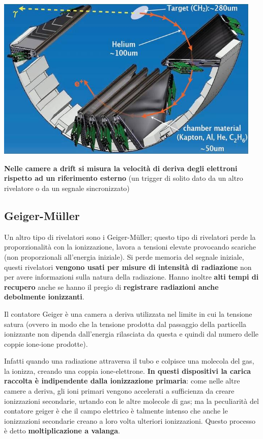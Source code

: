 \documentclass[a4paper,11pt,twoside,openany]{book}
\theoremstyle{definition}
\theoremstyle{plain}
\theoremstyle{plain}
\theoremstyle{definition}
\begin{document}
\begin{center}
\includegraphics[width=5in]{immagini/drift.jpg} %
\end{center}

\textbf{Nelle camere a drift si misura la velocità di deriva degli elettroni rispetto ad un riferimento esterno} (un trigger di solito dato da un altro rivelatore o da un segnale sincronizzato)

\subsection{Geiger-Müller} %
Un altro tipo di rivelatori sono i Geiger-Müller; questo tipo di rivelatori perde la proporzionalità con la ionizzazione, lavora a tensioni elevate provocando scariche (non proporzionali all'energia iniziale). Si perde memoria del segnale iniziale, questi rivelatori \textbf{vengono usati per misure di intensità di radiazione} non per avere informazioni sulla natura della radiazione. Hanno inoltre \textbf{alti tempi di recupero} anche se hanno il pregio di \textbf{registrare radiazioni anche debolmente ionizzanti}.

Il contatore Geiger è una camera a deriva utilizzata nel limite in cui la tensione satura (ovvero in modo che la tensione prodotta dal passaggio della particella ionizzante non dipenda dall'energia rilasciata da questa e quindi dal numero delle coppie ione-ione prodotte).

Infatti quando una radiazione attraversa il tubo e colpisce una molecola del gas, la ionizza, creando una coppia ione-elettrone. \textbf{In questi dispositivi la carica raccolta è indipendente dalla ionizzazione primaria}: come nelle altre camere a deriva, gli ioni primari vengono accelerati a sufficienza da creare ionizzazioni secondarie, urtando con le altre molecole di gas; ma la peculiarità del contatore geiger è che il campo elettrico è talmente intenso che anche le ionizzazioni secondarie creano a loro volta ulteriori ionizzazioni. Questo processo è detto \textbf{moltiplicazione a valanga}.
\end{document}
